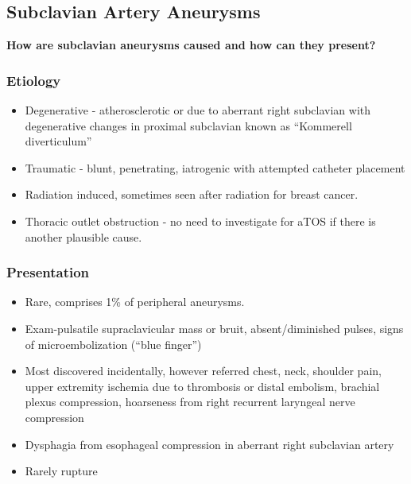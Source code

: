 \documentclass[
]{book}
\providecommand{\tightlist}{%
  \setlength{\itemsep}{0pt}\setlength{\parskip}{0pt}}
\begin{document}
\hypertarget{subclavian-artery-aneurysms}{%
\subsection{Subclavian Artery Aneurysms}\label{subclavian-artery-aneurysms}}

\textbf{How are subclavian aneurysms caused and how can they present?}
\citep{baig84UpperExtremity2019}

\hypertarget{etiology}{%
\subsubsection{Etiology}\label{etiology}}

\begin{itemize}
\item
  Degenerative - atherosclerotic or due to aberrant right subclavian
  with degenerative changes in proximal subclavian known as ``Kommerell
  diverticulum''
\item
  Traumatic - blunt, penetrating, iatrogenic with attempted catheter
  placement
\item
  Radiation induced, sometimes seen after radiation for breast
  cancer.\citep{mohan2016}
\item
  Thoracic outlet obstruction - no need to investigate for aTOS if
  there is another plausible cause.
\end{itemize}

\hypertarget{presentation}{%
\subsubsection{Presentation}\label{presentation}}

\begin{itemize}
\tightlist
\item
  Rare, comprises 1\% of peripheral aneurysms.
\item
  Exam-pulsatile supraclavicular mass or bruit, absent/diminished
  pulses, signs of microembolization (``blue finger'')
\item
  Most discovered incidentally, however referred chest, neck, shoulder
  pain, upper extremity ischemia due to thrombosis or distal embolism,
  brachial plexus compression, hoarseness from right recurrent
  laryngeal nerve compression
\item
  Dysphagia from esophageal compression in aberrant right subclavian
  artery
\item
  Rarely rupture
\end{itemize}
\end{document}
